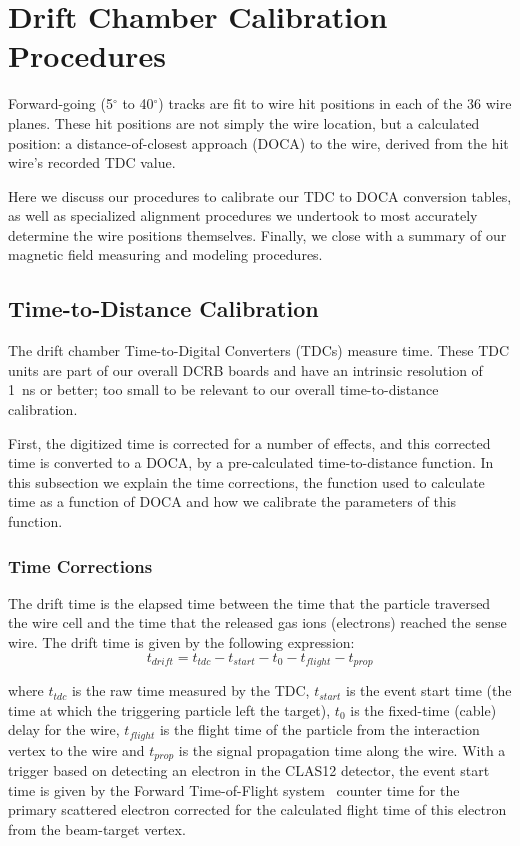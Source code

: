 \section{Drift Chamber Calibration Procedures}
\label{calibration}

Forward-going (5$^{\circ}$ to 40$^{\circ}$) tracks are fit to
wire hit positions in each of the 36 wire planes.  These
hit positions are not simply the wire location, but 
a calculated position: a distance-of-closest approach (DOCA)
to the wire, derived from the hit wire's recorded TDC value.  

Here we discuss our procedures to calibrate our TDC to DOCA conversion
tables, as well as specialized alignment procedures we undertook
to most accurately determine the wire positions themselves.
Finally, we close with a summary of our magnetic field measuring
and modeling procedures.

\subsection{Time-to-Distance Calibration}

The drift chamber Time-to-Digital Converters (TDCs) measure time.  
These TDC units are part of our overall DCRB boards and
have an intrinsic resolution of 1~ns or better; too small to be relevant to
our overall time-to-distance calibration.

First, the digitized time is corrected for a number of effects, and this corrected time is converted
to a DOCA, by a pre-calculated time-to-distance function.  In this subsection we 
explain the time corrections, the function used to calculate time as a 
function of DOCA and how we calibrate the parameters of this function.

\subsubsection{Time Corrections}

The drift time is the elapsed time between the time that the particle 
traversed the wire cell and the time that the released gas ions (electrons)
reached the sense wire.
The drift time is given by the following expression:
\begin{equation} 
\label{tdrift}
t_{drift} = t_{tdc} - t_{start} - t_{0} - t_{flight} - t_{prop}
\end{equation}

\noindent
where $t_{tdc}$ is the raw time measured by the TDC, $t_{start}$ is the event start time (the time at which
the triggering particle left the target),  $t_0$ is the fixed-time (cable) delay for the wire, $t_{flight}$ is the 
flight time of the particle from the interaction vertex to the wire and $t_{prop}$ 
is the signal propagation time along the wire.
With a trigger based on detecting an electron in the CLAS12 detector, the event start time is 
given by the Forward Time-of-Flight system~\cite{ftof-nim} counter time for the primary scattered
electron corrected for the calculated flight time of this electron from the beam-target vertex.

